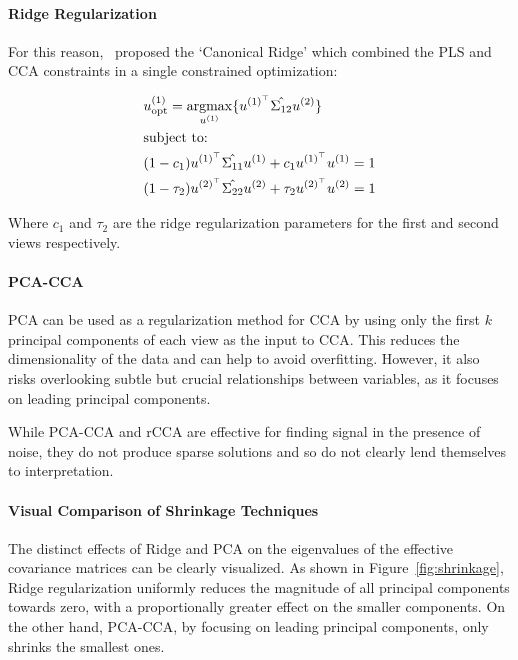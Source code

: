 \paragraph{Ridge Regularization}

For this reason,~\cite{vinod1976canonical} proposed the `Canonical Ridge' which combined the PLS and CCA constraints in a single constrained optimization:

\begin{align}
     & u^{(1)}_{\text{opt}} = \underset{u^{(1)}}{\mathrm{argmax}} \{ u^{(1)^{\top}} \hat{\Sigma_{12}} u^{(2)} \} \\
     & \text{subject to:} \notag \\
     & (1 - c_1) u^{(1)^{\top}} \hat{\Sigma_{11}} u^{(1)} + c_1 u^{(1)^{\top}} u^{(1)} = 1 \notag \\
     & (1 - \tau_2) u^{(2)^{\top}} \hat{\Sigma_{22}} u^{(2)} + \tau_2 u^{(2)^{\top}} u^{(2)} = 1 \notag
\end{align}

Where $c_1$ and $\tau_2$ are the ridge regularization parameters for the first and second views respectively.

\paragraph{PCA-CCA} PCA can be used as a regularization method for CCA by using only the first \( k \) principal components of each view as the input to CCA.
This reduces the dimensionality of the data and can help to avoid overfitting.
However, it also risks overlooking subtle but crucial relationships between variables, as it focuses on leading principal components.

While PCA-CCA and rCCA are effective for finding signal in the presence of noise, they do not produce sparse
solutions and so do not clearly lend themselves to interpretation.

\paragraph{Visual Comparison of Shrinkage Techniques}

The distinct effects of Ridge and PCA on the eigenvalues of the effective covariance matrices can be clearly visualized.
As shown in Figure~\ref{fig:shrinkage}, Ridge regularization uniformly reduces the magnitude of all principal components towards zero, with a proportionally greater effect on the smaller components.
On the other hand, PCA-CCA, by focusing on leading principal components, only shrinks the smallest ones.

